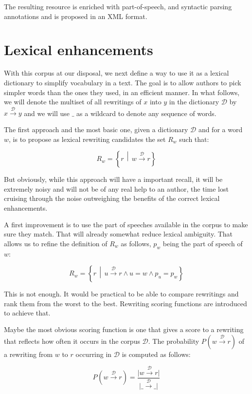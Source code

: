\documentclass[a4paper, 11pt, onepage]{scrreprt}
\newcommand\maps[1]{\xrightarrow{\mathcal{#1}}}
\newcommand\card[1]{\lvert #1 \rvert}
\newcommand\suchthat{\, \middle| \,}
\newcommand\proba[2][]{P_{#1} \left( #2 \right)}
\begin{document}
The resulting resource is enriched with part-of-speech, and syntactic
parsing annotations and is proposed in an XML format.

\section{Lexical enhancements}
\label{sec:lexical-enhancements}

With this corpus at our disposal, we next define a way to use it as a
lexical dictionary to simplify vocabulary in a text. The goal is to
allow authors to pick simpler words than the ones they used, in an
efficient manner. In what follows, we will denote the multiset of all
rewritings of $x$ into $y$ in the dictionary $\mathcal{D}$ by $x
\maps{D} y$ and we will use $\_$ as a wildcard to denote any sequence
of words.

The first approach and the most basic one, given a dictionary
$\mathcal{D}$ and for a word $w$, is to propose as lexical rewriting
candidates the set $R_w$ such that:

\[
R_w = \left\{r \suchthat w \maps{D} r\right\}
\]

But obviously, while this approach will have a important recall, it
will be extremely noisy and will not be of any real help to an author,
the time lost cruising through the noise outweighing the benefits of
the correct lexical enhancements.

A first improvement is to use the part of speeches available in the
corpus to make sure they match. That will already somewhat reduce
lexical ambiguity. That allows us to refine the definition of $R_w$ as
follows, $p_w$ being the part of speech of $w$:

\begin{equation*}
  R_w = \left\{
    r \suchthat u \maps{D} r \land u = w \land p_u = p_w
  \right\}
\end{equation*}

This is not enough. It would be practical to be able to compare
rewritings and rank them from the worst to the best. Rewriting scoring
functions are introduced to achieve that.

Maybe the most obvious scoring function is one that gives a score to a
rewriting that reflects how often it occurs in the corpus
$\mathcal{D}$. The probability $\proba{w \maps{D} r}$ of a rewriting
from $w$ to $r$ occurring in $\mathcal{D}$ is computed as follows:

\begin{equation*}
  \proba{w \maps{D} r} = \frac{\card{w \maps{D} r}}{\card{\_ \maps{D} \_}}
\end{equation*}
\end{document}
